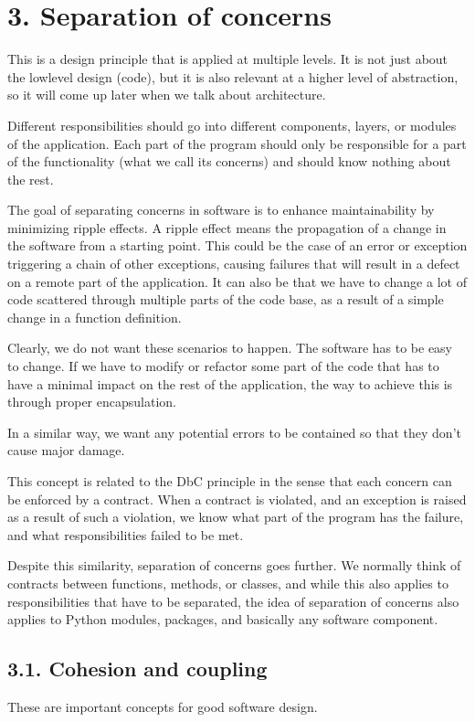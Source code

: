 \documentclass[a4paper,10pt,english]{sphinxmanual}
\begin{document}
\section{3. Separation of concerns}
\label{\detokenize{chapters/3_general_traits/index:separation-of-concerns}}
This is a design principle that is applied at multiple levels. It is not just about the low\sphinxhyphen{}level design
(code), but it is also relevant at a higher level of abstraction, so it will come up later when we talk about
architecture.

Different responsibilities should go into different components, layers, or modules of the application. Each
part of the program should only be responsible for a part of the functionality (what we call its concerns) and
should know nothing about the rest.

The goal of separating concerns in software is to enhance maintainability by minimizing ripple effects. A
ripple effect means the propagation of a change in the software from a starting point. This could be the case
of an error or exception triggering a chain of other exceptions, causing failures that will result in a defect
on a remote part of the application. It can also be that we have to change a lot of code scattered through
multiple parts of the code base, as a result of a simple change in a function definition.

Clearly, we do not want these scenarios to happen. The software has to be easy to change. If we have to modify
or refactor some part of the code that has to have a minimal impact on the rest of the application, the way to
achieve this is through proper encapsulation.

In a similar way, we want any potential errors to be contained so that they don’t cause major damage.

This concept is related to the DbC principle in the sense that each concern can be enforced by a contract.
When a contract is violated, and an exception is raised as a result of such a violation, we know what part of
the program has the failure, and what responsibilities failed to be met.

Despite this similarity, separation of concerns goes further. We normally think of contracts between
functions, methods, or classes, and while this also applies to responsibilities that have to be separated, the
idea of separation of concerns also applies to Python modules, packages, and basically any software component.


\subsection{3.1. Cohesion and coupling}
\label{\detokenize{chapters/3_general_traits/index:cohesion-and-coupling}}
These are important concepts for good software design.
\end{document}
